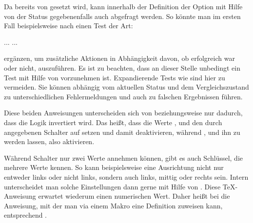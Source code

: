 \begin{Example}
  Da  bereits von 
  gesetzt wird, kann innerhalb der Definition der Option mit Hilfe von
   der Status gegebenenfalls auch
  abgefragt werden. So könnte man im ersten Fall beispielsweise nach
   einen Test der Art:
\begin{lstcode}
  \ifx\FamilyKeyState\FamilyKeyStateProcessed
      ...
  \else
      ...
  \fi   
\end{lstcode}
  ergänzen, um zusätzliche Aktionen in Abhängigkeit davon, ob
   erfolgreich war oder nicht,
  auszuführen. Es ist zu beachten, dass an dieser Stelle
  unbedingt ein Test mit Hilfe von  vorzunehmen ist. Expandierende
  Tests wie  sind hier zu vermeiden. Sie können
  abhängig vom aktuellen Status und dem Vergleichszustand zu unterschiedlichen
  Fehlermeldungen und auch zu falschen Ergebnissen führen.%
\end{Example}%
\EndIndexGroup
\ExampleEndFix


\begin{Declaration}
\end{Declaration}%
Diese beiden Anweisungen unterscheiden
sich von  beziehungsweise
 nur dadurch, dass die Logik invertiert
wird. Das heißt, dass die Werte ,  und 
den durch  angegebenen Schalter auf  setzen
und damit deaktivieren, während ,  und 
ihn zu  werden lassen, also aktivieren.%
\EndIndexGroup

\begin{Declaration}
\end{Declaration}
Während Schalter nur zwei Werte annehmen können, gibt es auch Schlüssel, die
mehrere Werte kennen. So kann beispielsweise eine Ausrichtung nicht nur
entweder links oder nicht links, sondern auch links, mittig oder rechts
sein. Intern unterscheidet man solche Einstellungen dann gerne mit Hilfe von
. Diese \TeX-Anweisung erwartet wiederum einen
numerischen Wert. Daher heißt bei  die Anweisung, mit der
man via  einem Makro eine Definition zuweisen kann,
entsprechend .

